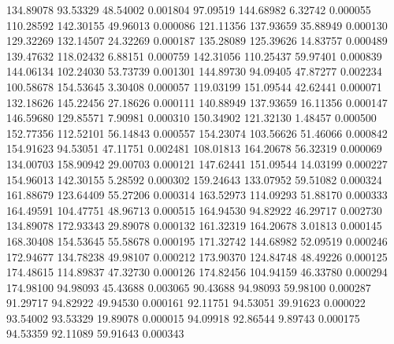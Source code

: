       134.89078       93.53329       48.54002       0.001804
       97.09519      144.68982        6.32742       0.000055
      110.28592      142.30155       49.96013       0.000086
      121.11356      137.93659       35.88949       0.000130
      129.32269      132.14507       24.32269       0.000187
      135.28089      125.39626       14.83757       0.000489
      139.47632      118.02432        6.88151       0.000759
      142.31056      110.25437       59.97401       0.000839
      144.06134      102.24030       53.73739       0.001301
      144.89730       94.09405       47.87277       0.002234
      100.58678      154.53645        3.30408       0.000057
      119.03199      151.09544       42.62441       0.000071
      132.18626      145.22456       27.18626       0.000111
      140.88949      137.93659       16.11356       0.000147
      146.59680      129.85571        7.90981       0.000310
      150.34902      121.32130        1.48457       0.000500
      152.77356      112.52101       56.14843       0.000557
      154.23074      103.56626       51.46066       0.000842
      154.91623       94.53051       47.11751       0.002481
      108.01813      164.20678       56.32319       0.000069
      134.00703      158.90942       29.00703       0.000121
      147.62441      151.09544       14.03199       0.000227
      154.96013      142.30155        5.28592       0.000302
      159.24643      133.07952       59.51082       0.000324
      161.88679      123.64409       55.27206       0.000314
      163.52973      114.09293       51.88170       0.000333
      164.49591      104.47751       48.96713       0.000515
      164.94530       94.82922       46.29717       0.002730
      134.89078      172.93343       29.89078       0.000132
      161.32319      164.20678        3.01813       0.000145
      168.30408      154.53645       55.58678       0.000195
      171.32742      144.68982       52.09519       0.000246
      172.94677      134.78238       49.98107       0.000212
      173.90370      124.84748       48.49226       0.000125
      174.48615      114.89837       47.32730       0.000126
      174.82456      104.94159       46.33780       0.000294
      174.98100       94.98093       45.43688       0.003065
       90.43688       94.98093       59.98100       0.000287
       91.29717       94.82922       49.94530       0.000161
       92.11751       94.53051       39.91623       0.000022
       93.54002       93.53329       19.89078       0.000015
       94.09918       92.86544        9.89743       0.000175
       94.53359       92.11089       59.91643       0.000343
